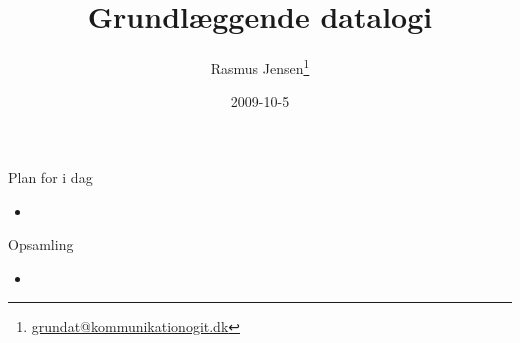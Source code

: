 \documentclass[a4paper,landscape]{slides}
\title{Grundlæggende datalogi}
\author{Rasmus Jensen\footnote{\url{grundat@kommunikationogit.dk}}}
\date{2009-10-5}
\begin{document}
\maketitle

\begin{comment}
 - opsamling/repetition
 - afleveringsopgaven
 - kommandoprompt, ssh, tilgang til server etc.
 - repetition http, introduktion til cgi
 - opsamling om html, forms, strukturerede data
\end{comment}

\begin{slide}
	\begin{center} {\large 
            Plan for i dag
	} \end{center}
	\begin{itemize} \addtolength{\itemsep}{-\baselineskip}
		\item 
	\end{itemize}
\end{slide}

\begin{slide}
	\begin{center} {\large 
            Opsamling
	} \end{center}
	\begin{itemize} \addtolength{\itemsep}{-\baselineskip}
                \item 
	\end{itemize}
\end{slide}
\end{document}

